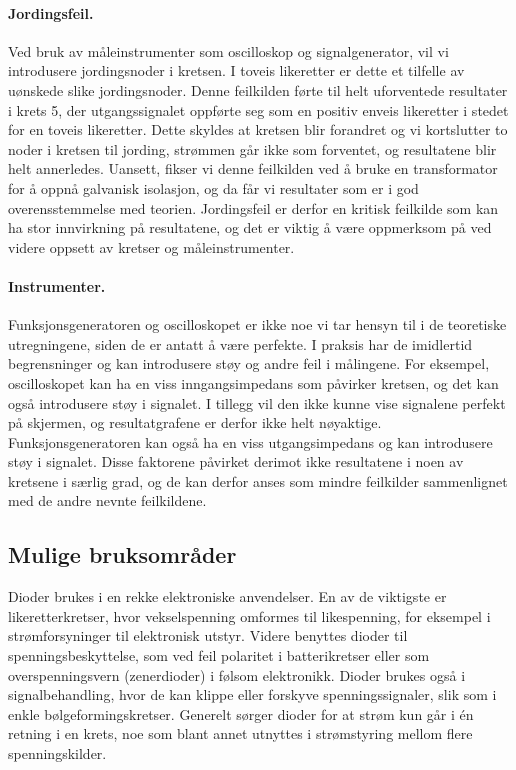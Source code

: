 \paragraph{Jordingsfeil. } Ved bruk av måleinstrumenter som oscilloskop og signalgenerator, vil vi introdusere jordingsnoder i kretsen. I toveis likeretter er dette et tilfelle av uønskede slike jordingsnoder. Denne feilkilden førte til helt uforventede resultater i krets 5, der utgangssignalet oppførte seg som en positiv enveis likeretter i stedet for en toveis likeretter. Dette skyldes at kretsen blir forandret og vi kortslutter to noder i kretsen til jording, strømmen går ikke som forventet, og resultatene blir helt annerledes. Uansett, fikser vi denne feilkilden ved å bruke en transformator for å oppnå galvanisk isolasjon, og da får vi resultater som er i god overensstemmelse med teorien. Jordingsfeil er derfor en kritisk feilkilde som kan ha stor innvirkning på resultatene, og det er viktig å være oppmerksom på ved videre oppsett av kretser og måleinstrumenter.

\paragraph{Instrumenter. } Funksjonsgeneratoren og oscilloskopet er ikke noe vi tar hensyn til i de teoretiske utregningene, siden de er antatt å være perfekte. I praksis har de imidlertid begrensninger og kan introdusere støy og andre feil i målingene. For eksempel, oscilloskopet kan ha en viss inngangsimpedans som påvirker kretsen, og det kan også introdusere støy i signalet. I tillegg vil den ikke kunne vise signalene perfekt på skjermen, og resultatgrafene er derfor ikke helt nøyaktige. Funksjonsgeneratoren kan også ha en viss utgangsimpedans og kan introdusere støy i signalet. Disse faktorene påvirket derimot ikke resultatene i noen av kretsene i særlig grad, og de kan derfor anses som mindre feilkilder sammenlignet med de andre nevnte feilkildene.

\subsection{Mulige bruksområder}
Dioder brukes i en rekke elektroniske anvendelser. En av de viktigste er likeretterkretser, hvor vekselspenning omformes til likespenning, for eksempel i strømforsyninger til elektronisk utstyr. Videre benyttes dioder til spenningsbeskyttelse, som ved feil polaritet i batterikretser eller som overspenningsvern (zenerdioder) i følsom elektronikk. Dioder brukes også i signalbehandling, hvor de kan klippe eller forskyve spenningssignaler, slik som i enkle bølgeformingskretser. Generelt sørger dioder for at strøm kun går i én retning i en krets, noe som blant annet utnyttes i strømstyring mellom flere spenningskilder.

